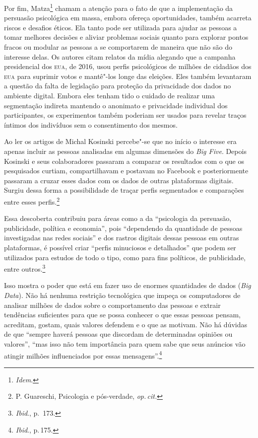 Por fim, Matza\footnote{\textit{Idem}.} chamam a atenção para o fato de que a
implementação da persuasão psicológica em massa, embora ofereça
oportunidades, também acarreta riscos e desafios éticos. Ela tanto pode
ser utilizada para ajudar as pessoas a tomar melhores decisões e aliviar
problemas sociais quanto para explorar pontos fracos ou modular as
pessoas a se comportarem de maneira que não são do interesse delas. Os
autores citam relatos da mídia alegando que a campanha presidencial dos
\textsc{eua}, de 2016, usou perfis psicológicos de milhões de cidadãos dos \textsc{eua}
para suprimir votos e mantê"-los longe das eleições. Eles também
levantaram a questão da falta de legislação para proteção da privacidade
dos dados no ambiente digital. Embora eles tenham tido o cuidado de
realizar uma segmentação indireta mantendo o anonimato e privacidade
individual dos participantes, os experimentos também poderiam ser usados
para revelar traços íntimos dos indivíduos sem o consentimento dos
mesmos.

Ao ler os artigos de Michal Kosinski percebe"-se que no início o
interesse era apenas incluir as pessoas analisadas em algumas dimensões
do \textit{Big Five}. Depois Kosinski e seus colaboradores passaram a
comparar os resultados com o que os pesquisados curtiam, compartilhavam
e postavam no Facebook e posteriormente passaram a cruzar esses dados
com os dados de outras plataformas digitais. Surgiu dessa forma a
possibilidade de traçar perfis segmentados e comparações entre esses
perfis.\footnote{P. Guareschi, Psicologia e pós-verdade, \textit{op.\,cit.}}

Essa descoberta contribuiu para áreas como a da ``psicologia da
persuasão, publicidade, política e economia'', pois ``dependendo da
quantidade de pessoas investigadas nas redes sociais'' e dos rastros
digitais dessas pessoas em outras plataformas, é possível criar ``perfis
minuciosos e detalhados'' que podem ser utilizados para estudos de todo
o tipo, como para fins políticos, de publicidade, entre outros.\footnote{\textit{Ibid}., p.\, 173.}

Isso mostra o poder que está em fazer uso de enormes quantidades de
dados (\textit{Big Data}). Não há nenhuma restrição tecnológica que impeça
os computadores de analisar milhões de dados sobre o comportamento das
pessoas e extrair tendências suficientes para que se possa conhecer o
que essas pessoas pensam, acreditam, gostam, quais valores defendem e o que as motivam. Não há dúvidas de que ``sempre haverá pessoas que discordam de determinadas opiniões ou valores'', ``mas isso não tem
importância para quem sabe que seus anúncios vão atingir milhões
influenciados por essas mensagens''.\footnote{\textit{Ibid}., p.\,175.}

